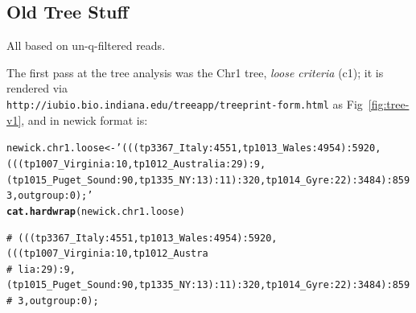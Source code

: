 \documentclass{article}\usepackage[]{graphicx}\usepackage[]{color}
\makeatletter
\newcommand{\hlstr}[1]{\textcolor[rgb]{0.192,0.494,0.8}{#1}}%
\newcommand{\hlstd}[1]{\textcolor[rgb]{0.345,0.345,0.345}{#1}}%
\newcommand{\hlkwb}[1]{\textcolor[rgb]{0.69,0.353,0.396}{#1}}%
\newcommand{\hlkwd}[1]{\textcolor[rgb]{0.737,0.353,0.396}{\textbf{#1}}}%
\newenvironment{kframe}{%
 \def\at@end@of@kframe{}%
 \ifinner\ifhmode%
  \def\at@end@of@kframe{\end{minipage}}%
  \begin{minipage}{\columnwidth}%
 \fi\fi%
 \def\FrameCommand##1{\hskip\@totalleftmargin \hskip-\fboxsep
 \colorbox{shadecolor}{##1}\hskip-\fboxsep
     \hskip-\linewidth \hskip-\@totalleftmargin \hskip\columnwidth}%
 \MakeFramed {\advance\hsize-\width
   \@totalleftmargin\z@ \linewidth\hsize
   \@setminipage}}%
 {\par\unskip\endMakeFramed%
 \at@end@of@kframe}
\newenvironment{knitrout}{}{} %
\makeatother
\begin{document}
\subsection{Old Tree Stuff}

All based on un-q-filtered reads.

The first pass at the tree analysis was the Chr1 tree, \emph{loose criteria} (c1); it is rendered via \\{\small\tt http://iubio.bio.indiana.edu/treeapp/treeprint-form.html} as Fig~\ref{fig:tree-v1}, and in newick format is:

\begin{knitrout}\footnotesize
{}\color{fgcolor}\begin{kframe}
\begin{alltt}
\hlstd{newick.chr1.loose} \hlkwb{<-} \hlstr{'(((tp3367_Italy:4551,tp1013_Wales:4954):5920,(((tp1007_Virginia:10,tp1012_Australia:29):9,(tp1015_Puget_Sound:90,tp1335_NY:13):11):320,tp1014_Gyre:22):3484):8593,outgroup:0);'}
\hlkwd{cat.hardwrap}\hlstd{(newick.chr1.loose)}
\end{alltt}
\begin{verbatim}
# (((tp3367_Italy:4551,tp1013_Wales:4954):5920,(((tp1007_Virginia:10,tp1012_Austra 
# lia:29):9,(tp1015_Puget_Sound:90,tp1335_NY:13):11):320,tp1014_Gyre:22):3484):859 
# 3,outgroup:0);
\end{verbatim}
\end{kframe}
\end{knitrout}
\end{document}
